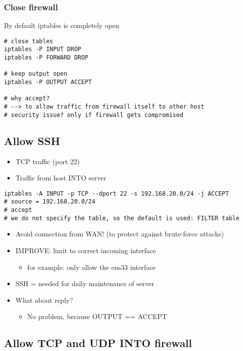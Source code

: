 \documentclass{article}
\begin{document}
\subsubsection{Close firewall}

By default iptables is completely open

\begin{verbatim}
# close tables
iptables -P INPUT DROP
iptables -P FORWARD DROP

# keep output open
iptables -P OUTPUT ACCEPT

# why accept? 
# --> to allow traffic from firewall itself to other host
# security issue? only if firewall gets compromised
\end{verbatim}


\subsection{Allow SSH}

\begin{itemize}
    \item TCP traffic (port 22)
    \item Traffic from host INTO server
\end{itemize}

\begin{verbatim}
iptables -A INPUT -p TCP --dport 22 -s 192.168.20.0/24 -j ACCEPT
# source = 192.168.20.0/24
# accept 
# we do not specify the table, so the default is used: FILTER table
\end{verbatim}

\begin{itemize}
    \item Avoid connection from WAN! (to protect against brute-force attacks)
    \item IMPROVE: limit to correct incoming interface
    \begin{itemize}
        \item for example: only allow the ens33 interface
    \end{itemize}
    \item SSH = needed for daily maintenance of server
    \item What about reply?
    \begin{itemize}
        \item No problem, because OUTPUT == ACCEPT
    \end{itemize}
\end{itemize}

\subsection{Allow TCP and UDP INTO firewall}
\end{document}
